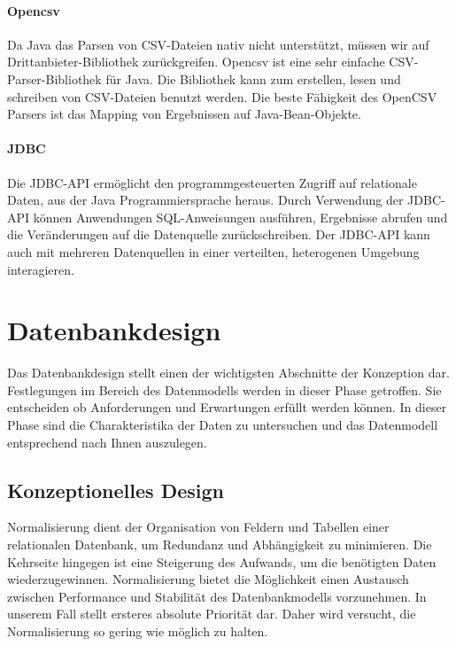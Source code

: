 \paragraph{Opencsv}

Da Java das Parsen von CSV-Dateien nativ nicht unterstützt, müssen wir auf Drittanbieter-Bibliothek zurückgreifen. Opencsv ist eine sehr einfache CSV-Parser-Bibliothek für Java. Die Bibliothek kann zum erstellen, lesen und schreiben von CSV-Dateien benutzt werden. Die beste Fähigkeit des OpenCSV Parsers ist das Mapping von Ergebnissen auf Java-Bean-Objekte.

\paragraph{JDBC}

Die JDBC-API ermöglicht den programmgesteuerten Zugriff auf relationale Daten, aus der Java Programmiersprache heraus. Durch Verwendung der JDBC-API können Anwendungen SQL-Anweisungen ausführen, Ergebnisse abrufen und die Veränderungen auf die Datenquelle zurückschreiben. Der JDBC-API kann auch mit mehreren Datenquellen in einer verteilten, heterogenen Umgebung interagieren. 

\section{Datenbankdesign}

Das Datenbankdesign stellt einen der wichtigsten Abschnitte der Konzeption dar. Festlegungen im Bereich des Datenmodells werden in dieser Phase getroffen. Sie entscheiden ob Anforderungen und Erwartungen erfüllt werden können. In dieser Phase sind die Charakteristika der Daten zu untersuchen und das Datenmodell entsprechend nach Ihnen auszulegen.

\subsection{Konzeptionelles Design}

Normalisierung dient der Organisation von Feldern und Tabellen einer relationalen Datenbank, um Redundanz und Abhängigkeit zu minimieren. Die Kehrseite hingegen ist eine Steigerung des Aufwands, um die benötigten Daten wiederzugewinnen. Normalisierung bietet die Möglichkeit einen Austausch zwischen Performance und Stabilität des Datenbankmodells vorzunehmen. 
In unserem Fall stellt ersteres absolute Priorität dar. Daher wird versucht, die Normalisierung so gering wie möglich zu halten. 

